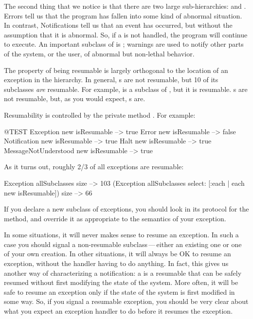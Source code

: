 \documentclass[a4paper,10pt,twoside]{book}
\begin{document}
The second thing that we notice is that there are two large sub-hierarchies:  and . 
Errors tell us that the program has fallen into some kind of abnormal situation. 
In contrast, Notifications tell us that an event has occurred, but without the assumption that it is abnormal. 
So, if a  is not handled, the program will continue to execute. 
An important subclass of  is ;  warnings are used to notify other parts of the system, or the user, of abnormal but non-lethal behavior.
%

The property of being resumable is largely orthogonal to the location of an exception in the hierarchy.   In general, s are not resumable, but 10 of its subclasses \emph{are} resumable.  For example,  is a subclass of , but it is resumable.  s are not resumable, but, as you would expect, s are. 

Resumability is controlled by the private  method . 
For example:
\begin{code}{@TEST}
Exception new isResumable --> true
Error new isResumable --> false
Notification new isResumable --> true
Halt new isResumable --> true
MessageNotUnderstood new isResumable --> true
\end{code}

As it turns out, roughly 2/3 of all exceptions are resumable:
\begin{code}{}
Exception allSubclasses size --> 103
(Exception allSubclasses select: [:each | each new isResumable]) size --> 66
\end{code}
If you declare a new subclass of exceptions, you should look in its protocol for the  method, and override it as appropriate to the semantics of your exception.

In some situations, it will never makes sense to resume an exception.
In such a case you should signal a non-resumable subclass\,---\,either an existing one or one of your own creation.
In other situations, it will always be OK to resume an exception, without the handler having to do anything.
In fact, this gives us another way of characterizing a notification:
a  is a resumable  that can be safely resumed without first modifying the state of the system.
More often, it will be safe to resume an exception only if the state of the system is first modified in some way.
So, if you signal a resumable exception, you should be very clear about what you expect an exception handler to do before it resumes the exception.
\end{document}
